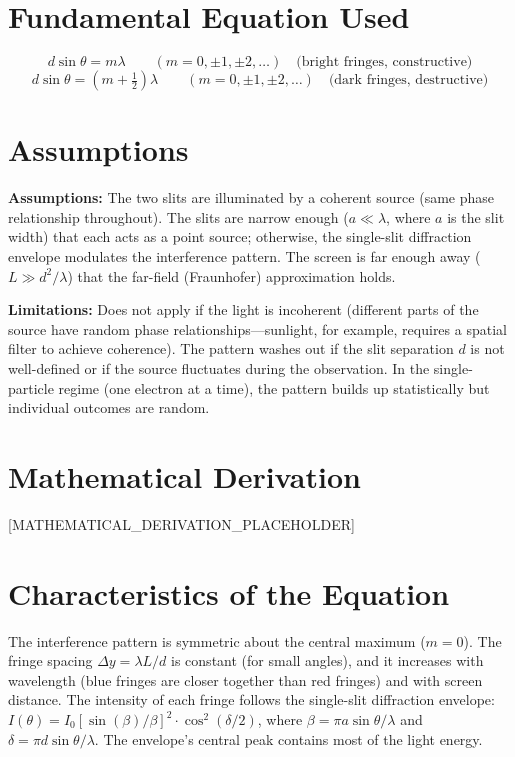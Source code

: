 \documentclass[11pt,openright]{book}
\begin{document}
\section*{Fundamental Equation Used}

\begin{equation}
d\sin\theta = m\lambda \qquad (m = 0, \pm 1, \pm 2, \ldots) \quad \text{(bright fringes, constructive)}
\end{equation}
\begin{equation}
d\sin\theta = \left(m + \tfrac{1}{2}\right)\lambda \qquad (m = 0, \pm 1, \pm 2, \ldots) \quad \text{(dark fringes, destructive)}
\end{equation}
\section*{Assumptions}

\textbf{Assumptions:} The two slits are illuminated by a coherent source (same phase relationship throughout). The slits are narrow enough ($a \ll \lambda$, where $a$ is the slit width) that each acts as a point source; otherwise, the single-slit diffraction envelope modulates the interference pattern. The screen is far enough away ($L \gg d^2/\lambda$) that the far-field (Fraunhofer) approximation holds.


\textbf{Limitations:} Does not apply if the light is incoherent (different parts of the source have random phase relationships---sunlight, for example, requires a spatial filter to achieve coherence). The pattern washes out if the slit separation $d$ is not well-defined or if the source fluctuates during the observation. In the single-particle regime (one electron at a time), the pattern builds up statistically but individual outcomes are random.


\section*{Mathematical Derivation}

[MATHEMATICAL_DERIVATION_PLACEHOLDER]

\section*{Characteristics of the Equation}

The interference pattern is symmetric about the central maximum ($m = 0$). The fringe spacing $\Delta y = \lambda L/d$ is constant (for small angles), and it increases with wavelength (blue fringes are closer together than red fringes) and with screen distance. The intensity of each fringe follows the single-slit diffraction envelope: $I(\theta) = I_0[\sin(\beta)/\beta]^2 \cdot \cos^2(\delta/2)$, where $\beta = \pi a\sin\theta/\lambda$ and $\delta = \pi d\sin\theta/\lambda$. The envelope's central peak contains most of the light energy.
\end{document}
